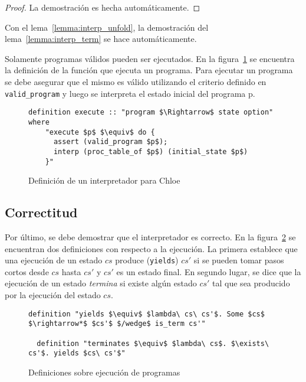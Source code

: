 \begin{proof}
La demostración es hecha automáticamente.
\end{proof}

Con el lema~\ref{lemma:interp_unfold}, la demostración del lema~\ref{lemma:interp_term} se hace automáticamente.

Solamente programas válidos pueden ser ejecutados.
En la figura~\ref{fig:execute_def} se encuentra la definición de la función que ejecuta un programa.
Para ejecutar un programa se debe asegurar que el mismo es válido utilizando el criterio definido en \verb|valid_program| y luego se interpreta el estado inicial del programa p.

\begin{figure}
  \begin{lstlisting}[frame=single, mathescape=true]
  definition execute :: "program $\Rightarrow$ state option" where
    "execute $p$ $\equiv$ do {
      assert (valid_program $p$);
      interp (proc_table_of $p$) (initial_state $p$)
    }"
  \end{lstlisting}

  \caption{Definición de un interpretador para Chloe}
  \label{fig:execute_def}
\end{figure}


\subsection{Correctitud}\label{subsection:correctness}

Por último, se debe demostrar que el interpretador es correcto.
En la figura~\ref{fig:execution_definitions} se encuentran dos definiciones con respecto a la ejecución.
La primera establece que una ejecución de un estado $cs$ produce (\verb|yields|) $cs'$ si se pueden tomar pasos cortos desde $cs$ hasta $cs'$ y $cs'$ es un estado final.
En segundo lugar, se dice que la ejecución de un estado \textit{termina} si existe algún estado $cs'$ tal que sea producido por la ejecución del estado $cs$.

\begin{figure}
  \begin{lstlisting}[frame=single, mathescape=true]
  definition "yields $\equiv$ $lambda\ cs\ cs'$. Some $cs$ $\rightarrow*$ $cs'$ $/wedge$ is_term cs'"

  definition "terminates $\equiv$ $lambda\ cs$. $\exists\ cs'$. yields $cs\ cs'$"
  \end{lstlisting}

  \caption{Definiciones sobre ejecución de programas}
  \label{fig:execution_definitions}
\end{figure}

